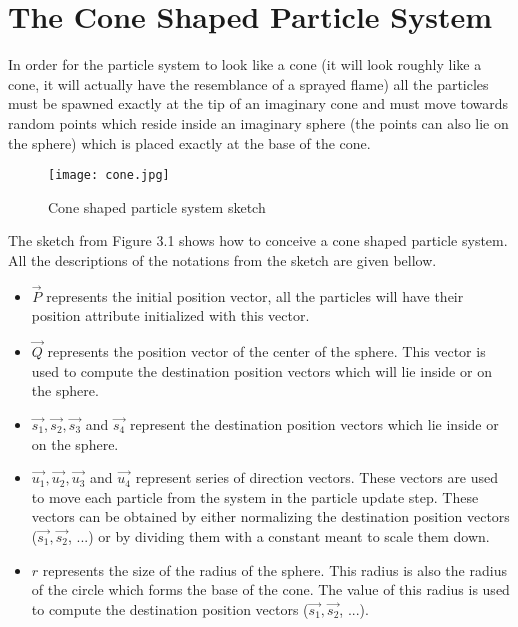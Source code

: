 \newpage
\section{The Cone Shaped Particle System}
In order for the particle system to look like a cone (it will look roughly like a cone, it will actually have the resemblance of a sprayed flame) all the particles must be spawned exactly at the tip of an imaginary cone and must move towards random points which reside inside an imaginary sphere (the points can also lie on the sphere) which is placed exactly at the base of the cone.\\

\begin{figure}[h]
	\caption{Cone shaped particle system sketch}
	\centering
	\texttt{[image: cone.jpg]}
\end{figure}

The sketch from Figure 3.1 shows how to conceive a cone shaped particle system. All the descriptions of the notations from the sketch are given bellow.\\

\begin{itemize}
	\item $\vec{P}$ represents the initial position vector, all the particles will have their position attribute initialized with this vector.
	
	\item $\vec{Q}$ represents the position vector of the center of the sphere. This vector is used to compute the destination position vectors which will lie inside or on the sphere.
	
	\item $\vec{s_1}, \vec{s_2}, \vec{s_3}$ and $\vec{s_4}$ represent the destination position vectors which lie inside or on the sphere.
	
	\item $\vec{u_1}, \vec{u_2}, \vec{u_3}$ and $\vec{u_4}$ represent series of direction vectors. These vectors are used to move each particle from the system in the particle update step. These vectors can be obtained by either normalizing the destination position vectors ($\vec{s_1}, \vec{s_2}$, ...) or by dividing them with a constant meant to scale them down.
	
	\item $r$ represents the size of the radius of the sphere. This radius is also the radius of the circle which forms the base of the cone. The value of this radius is used to compute the destination position vectors ($\vec{s_1}, \vec{s_2}$, ...).
\end{itemize}

